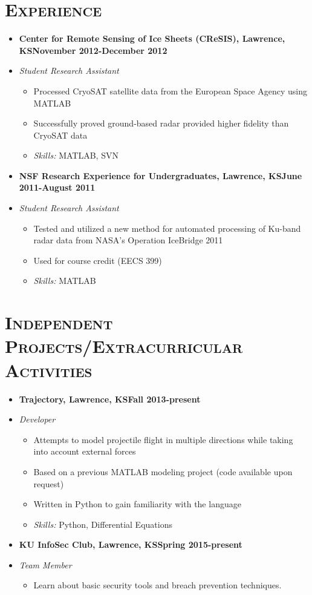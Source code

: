 \documentclass[10pt, oneside]{article}
\newcommand{\lr}[2]{#1\hfill#2}
\newcommand{\skills}[1]{
\item[] \textsl{Skills:} #1
}
\newenvironment{ressection}[1]{
  \section{\normalsize \scshape \selectfont #1 \normalfont}
  \vspace{-4pt}
  \begin{itemize} \itemsep-2pt
  }{
  \end{itemize}
  \vspace{-20pt}
}
\newenvironment{resitem}[4]{
\item[] \lr{\bfseries \selectfont #1\normalfont, #2} {#3}
\item[] \textsl{#4}
  \vspace{-4pt}
  \begin{itemize} \itemsep-2pt
  }{
  \end{itemize}
}
\begin{document}
\begin{ressection}{Experience}
  \begin{resitem}{Center for Remote Sensing of Ice Sheets (CReSIS)}{Lawrence, KS}{November 2012-December 2012}{Student Research Assistant}
  \item Processed CryoSAT satellite data from the European Space Agency using MATLAB
  \item Successfully proved ground-based radar provided higher fidelity than CryoSAT data
    \skills{MATLAB, SVN}
  \end{resitem}
   \begin{resitem}{NSF Research Experience for Undergraduates}{Lawrence, KS}{June 2011-August 2011}{Student Research Assistant}
  \item Tested and utilized a new method for automated processing of Ku-band radar data from NASA's Operation IceBridge 2011
  \item Used for course credit (EECS 399)
    \skills{MATLAB}
  \end{resitem}\end{ressection}
\begin{ressection}{Independent Projects/Extracurricular Activities}
  \begin{resitem}{Trajectory}{Lawrence, KS}{Fall 2013-present}{Developer}
    \item Attempts to model projectile flight in multiple directions while taking into account external forces
  \item Based on a previous MATLAB modeling project (code available upon request)
  \item Written in Python to gain familiarity with the language
  \skills{Python, Differential Equations}
  \end{resitem}
  
  \begin{resitem}{KU InfoSec Club}{Lawrence, KS}{Spring 2015-present}{Team Member}
  \item Learn about basic security tools and breach prevention techniques.
  
  \end{resitem}
  
\end{ressection}
\end{document}
